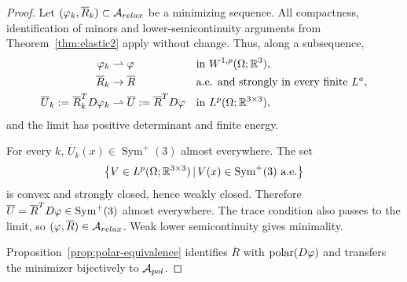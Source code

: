 \documentclass[10pt,a4paper]{amsart}
\begin{document}
\begin{proof}
Let $(\varphi_k, \overline R _k)\subset\mathcal A_{\rm relax}$ be a minimizing sequence. All compactness, identification of minors and lower-semicontinuity arguments from Theorem~\ref{thm:elastic2} apply without change. Thus, along a subsequence,
\begin{align}
\varphi_k&\rightharpoonup\varphi
&&\text{in }{\rm W}^{1,p}(\Omega;\mathbb R^3),
\notag\\
 \overline R _k&\to \overline  R 
&&\text{a.e. and strongly in every finite }{\rm L}^a,
\notag\\
\overline U_k:= \overline R _k^T{\rm D}\varphi_k
&\rightharpoonup
\overline U:= \overline R ^T{\rm D}\varphi
&&\text{in }{\rm L}^p(\Omega;\mathbb R^{3\times3}),
\end{align}
and the limit has positive determinant and finite energy.

For every $k$,
$
\overline U_k(x)\in\operatorname{Sym}^{+}(3)
$
almost everywhere. The set
\begin{align}
\left\{
V\in {\rm L}^p(\Omega;\mathbb R^{3\times3})\, |\,
V(x)\in\operatorname{Sym}^{+}(3)\ \text{a.e.}
\right\}
\end{align}
is convex and strongly closed, hence weakly closed. Therefore
$
\overline U= \overline R ^T{\rm D}\varphi\in\operatorname{Sym}^{+}(3)
$
almost everywhere. The trace condition also passes to the limit, so $(\varphi, \overline R )\in\mathcal A_{\rm relax}$. Weak lower semicontinuity gives minimality.

Proposition~\ref{prop:polar-equivalence} identifies $ \overline R $ with $\operatorname{polar}({\rm D}\varphi)$ and transfers the minimizer bijectively to $\mathcal A_{\rm pol}$.
\end{proof}
\end{document}

